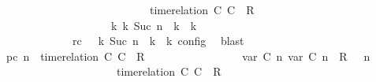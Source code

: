 \begin{isabellebody}
\ \ \ \ \ \ \ \ \ \ \ \ \ \ \ \ \ \ \ \ \ \ \ \ {\isasymturnstile}\ {\isasymPsi}\ {\isasymtriangleright}\ {\isacharparenleft}{\isacharparenleft}time{\isacharminus}relation\ {\isasymlfloor}C\ C\ {\isasymin}\ R{\isacharparenright}\ {\isacharhash}\ {\isasymPhi}{\isacharparenright}{\isacharparenright}\isanewline
\ \ \ \ \ \ \ \ \ \ \ \ \ \ \ \ \ \ \ \ {\isasymhookrightarrow}\isactrlbsup k\isactrlesup \ {\isacharparenleft}{\isasymGamma}\isactrlsub k{\isacharcomma}\ Suc\ n\ {\isasymturnstile}\ {\isasymPsi}\isactrlsub k\ {\isasymtriangleright}\ {\isasymPhi}\isactrlsub k{\isacharparenright}{\isacharparenright}{\isacartoucheclose}\isanewline
\ \ \ \ \ \ \ \ \ \ \ \ \ rc{\isacharcolon}{\isacartoucheopen}{\isasymrho}\ {\isasymin}\ {\isasymlbrakk}\ {\isasymGamma}\isactrlsub k{\isacharcomma}\ Suc\ n\ {\isasymturnstile}\ {\isasymPsi}\isactrlsub k\ {\isasymtriangleright}\ {\isasymPhi}\isactrlsub k\ {\isasymrbrakk}\isactrlsub c\isactrlsub o\isactrlsub n\isactrlsub f\isactrlsub i\isactrlsub g{\isacartoucheclose}\ \isamarkupfalse%
\ blast\isanewline
\ \ \ \ \ \ \ \ \isamarkupfalse%
\ pc{\isacharcolon}{\isacartoucheopen}{\isacharparenleft}{\isasymGamma}{\isacharcomma}\ n\ {\isasymturnstile}\ {\isacharparenleft}{\isacharparenleft}time{\isacharminus}relation\ {\isasymlfloor}C\ C\ {\isasymin}\ R{\isacharparenright}\ {\isacharhash}\ {\isasymPsi}{\isacharparenright}\ {\isasymtriangleright}\ {\isasymPhi}{\isacharparenright}\isanewline
\ \ \ \ \ \ \ \ \ \ \ \ {\isasymhookrightarrow}\ {\isacharparenleft}{\isacharparenleft}{\isacharparenleft}{\isasymlfloor}{\isasymtau}\isactrlsub v\isactrlsub a\isactrlsub r\ {\isacharparenleft}C\ n{\isacharparenright}{\isacharcomma}\ {\isasymtau}\isactrlsub v\isactrlsub a\isactrlsub r\ {\isacharparenleft}C\ n{\isacharparenright}{\isasymrfloor}\ {\isasymin}\ R{\isacharparenright}\ {\isacharhash}\ {\isasymGamma}{\isacharparenright}{\isacharcomma}\ n\isanewline
\ \ \ \ \ \ \ \ \ \ \ \ \ \ \ \ \ \ {\isasymturnstile}\ {\isasymPsi}\ {\isasymtriangleright}\ {\isacharparenleft}{\isacharparenleft}time{\isacharminus}relation\ {\isasymlfloor}C\ C\ {\isasymin}\ R{\isacharparenright}\ {\isacharhash}\ {\isasymPhi}{\isacharparenright}{\isacharparenright}{\isacartoucheclose}\isanewline
\ \ \ \ \ \ \ \ \ \ \isamarkupfalse%

\end{isabellebody}
